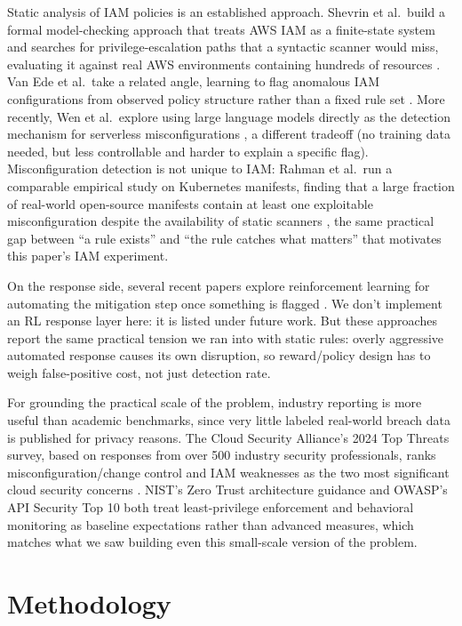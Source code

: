 \documentclass[11pt,a4paper]{article}
\begin{document}
Static analysis of IAM policies is an established approach. Shevrin et al.\ build a formal model-checking approach that treats AWS IAM as a finite-state system and searches for privilege-escalation paths that a syntactic scanner would miss, evaluating it against real AWS environments containing hundreds of resources \cite{shevrin2023}. Van Ede et al.\ take a related angle, learning to flag anomalous IAM configurations from observed policy structure rather than a fixed rule set \cite{vanede2022}. More recently, Wen et al.\ explore using large language models directly as the detection mechanism for serverless misconfigurations \cite{wen2024}, a different tradeoff (no training data needed, but less controllable and harder to explain a specific flag). Misconfiguration detection is not unique to IAM: Rahman et al.\ run a comparable empirical study on Kubernetes manifests, finding that a large fraction of real-world open-source manifests contain at least one exploitable misconfiguration despite the availability of static scanners \cite{rahman2023}, the same practical gap between ``a rule exists'' and ``the rule catches what matters'' that motivates this paper's IAM experiment.

On the response side, several recent papers explore reinforcement learning for automating the mitigation step once something is flagged \cite{rlsecurity2025,rlincident2025}. We don't implement an RL response layer here: it is listed under future work. But these approaches report the same practical tension we ran into with static rules: overly aggressive automated response causes its own disruption, so reward/policy design has to weigh false-positive cost, not just detection rate.

For grounding the practical scale of the problem, industry reporting is more useful than academic benchmarks, since very little labeled real-world breach data is published for privacy reasons. The Cloud Security Alliance's 2024 Top Threats survey, based on responses from over 500 industry security professionals, ranks misconfiguration/change control and IAM weaknesses as the two most significant cloud security concerns \cite{csa2024}. NIST's Zero Trust architecture guidance \cite{nist800207} and OWASP's API Security Top 10 \cite{owasp2023} both treat least-privilege enforcement and behavioral monitoring as baseline expectations rather than advanced measures, which matches what we saw building even this small-scale version of the problem.

\section{Methodology}
\end{document}
